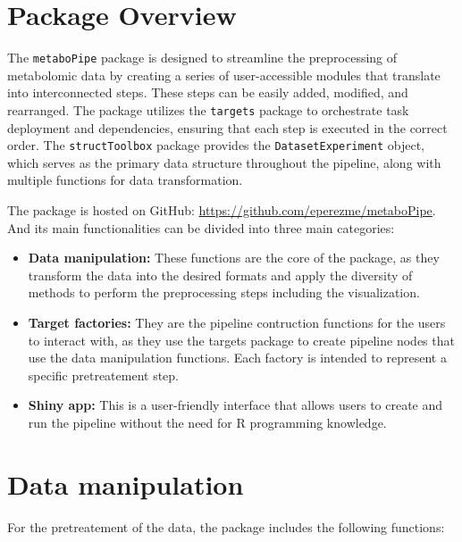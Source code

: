 \documentclass[ENG, BIB]{TFUOC}%
\begin{document}
\section{Package Overview}
The \texttt{metaboPipe} package is designed to streamline the preprocessing of metabolomic data by creating a series of user-accessible modules that translate into interconnected steps. These steps can be easily added, modified, and rearranged. The package utilizes the \texttt{targets} package to orchestrate task deployment and dependencies, ensuring that each step is executed in the correct order. The \texttt{structToolbox} package provides the \texttt{DatasetExperiment} object, which serves as the primary data structure throughout the pipeline, along with multiple functions for data transformation.

The package is hosted on GitHub: \url{https://github.com/eperezme/metaboPipe}. And its main functionalities can be divided into three main categories:
\begin{itemize}
    \item \textbf{Data manipulation:} These functions are the core of the package, as they transform the data into the desired formats and apply the diversity of methods to perform the preprocessing steps including the visualization.
    \item \textbf{Target factories:} They are the pipeline contruction functions for the users to interact with, as they use the targets package to create pipeline nodes that use the data manipulation functions. Each factory is intended to represent a specific pretreatement step.
    \item \textbf{Shiny app:} This is a user-friendly interface that allows users to create and run the pipeline without the need for R programming knowledge.
\end{itemize}

\section{Data manipulation}
For the pretreatement of the data, the package includes the following functions:
\end{document}
